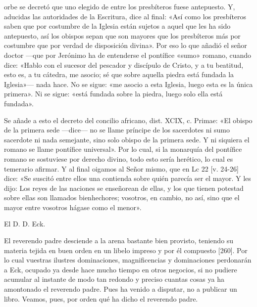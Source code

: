 orbe se decretó que uno elegido de entre los presbíteros fuese antepuesto. Y, aducidas las autoridades de la Escritura, dice al final: «Así como los presbíteros saben que por costumbre de la Iglesia están sujetos a aquel que les ha sido antepuesto, así los obispos sepan que son mayores que los presbíteros más por costumbre que por verdad de disposición divina». Por eso lo que añadió el señor doctor —que por Jerónimo ha de entenderse el pontífice «sumo» romano, cuando dice: «Hablo con el sucesor del pescador y discípulo de Cristo, y a tu beatitud, esto es, a tu cátedra, me asocio; sé que sobre aquella piedra está fundada la Iglesia»— nada hace. No se sigue: «me asocio a esta Iglesia, luego esta es la única primera». Ni se sigue: «está fundada sobre la piedra, luego solo ella está fundada».

Se añade a esto el decreto del concilio africano, dist. XCIX, c. Primae: «El obispo de la primera sede —dice— no se llame príncipe de los sacerdotes ni sumo sacerdote ni nada semejante, sino solo obispo de la primera sede. Y ni siquiera el romano se llame pontífice universal». Por lo cual, si la monarquía del pontífice romano se sostuviese por derecho divino, todo esto sería herético, lo cual es temerario afirmar. Y al final oigamos al Señor mismo, que en Lc 22 [v. 24-26] dice: «Se suscitó entre ellos una contienda sobre quién parecía ser el mayor. Y les dijo: Los reyes de las naciones se enseñorean de ellas, y los que tienen potestad sobre ellas son llamados bienhechores; vosotros, en cambio, no así, sino que el mayor entre vosotros hágase como el menor».

El D. D. Eck.

El reverendo padre desciende a la arena bastante bien provisto, teniendo su materia tejida en buen orden en un libelo impreso y por él compuesto [260]. Por lo cual vuestras ilustres dominaciones, magnificencias y dominaciones perdonarán a Eck, ocupado ya desde hace mucho tiempo en otros negocios, si no pudiere acumular al instante de modo tan redondo y preciso cuantas cosas ya ha amontonado el reverendo padre. Pues ha venido a disputar, no a publicar un libro. Veamos, pues, por orden qué ha dicho el reverendo padre.

